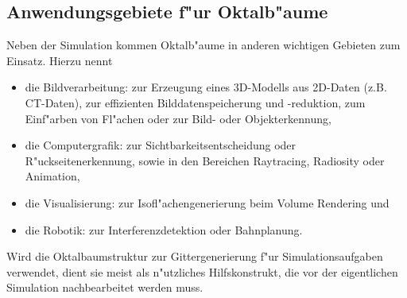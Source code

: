 \subsection{Anwendungsgebiete f"ur Oktalb"aume}
Neben der Simulation kommen Oktalb"aume in anderen wichtigen Gebieten zum 
Einsatz. Hierzu nennt \cite[S. 26]{diss_oct} 
\begin{itemize}
\item die Bildverarbeitung: zur Erzeugung eines 3D-Modells aus 2D-Daten (z.B. 
    CT-Daten), zur effizienten Bilddatenspeicherung und -reduktion, zum
    Einf"arben von Fl"achen oder zur Bild- oder Objekterkennung,
\item die Computergrafik: zur Sichtbarkeitsentscheidung oder 
    R"uckseitenerkennung, sowie in den Bereichen Raytracing, Radiosity oder 
    Animation,
\item die Visualisierung: zur Isofl"achengenerierung beim Volume Rendering 
    und
\item die Robotik: zur Interferenzdetektion oder Bahnplanung.
\end{itemize}

Wird die Oktalbaumstruktur zur Gittergenerierung f"ur Simulationsaufgaben 
verwendet, dient sie meist als n"utzliches Hilfskonstrukt, die vor der 
eigentlichen Simulation nachbearbeitet werden muss.

